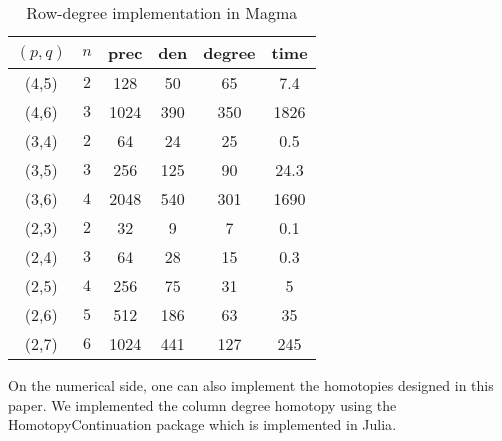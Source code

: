 \documentclass[amsthm]{elsart}
\begin{document}
\begin{center}
\begin{table}[h]
  \centering
  \begin{tabular}[]{cc|ccc|c}
    $(p,q)$ & $n$ & {\sf prec} & {\sf den} & {\sf degree} & {\sf time} \\
    \hline
    (4,5)   & $2$ &  128 &  50 &   65   &  7.4\\
    (4,6)   & $3$ & 1024 & 390 &  350   &1826 \\
    \hline
    (3,4)   & $2$ &   64 &  24 &   25   & 0.5 \\
    (3,5)   & $3$ &  256 & 125 &   90   & 24.3\\
    (3,6)   & $4$ & 2048 & 540 &  301   & 1690\\
    \hline
    (2,3)   & $2$ &  32  &   9 &    7   &  0.1\\
    (2,4)   & $3$ &  64  &  28 &   15   &  0.3\\
    (2,5)   & $4$ & 256  &  75 &   31   &    5\\
    (2,6)   & $5$ & 512  & 186 &   63   &   35\\
    (2,7)   & $6$ & 1024 & 441 &  127   &  245\\
    \hline
  \end{tabular}
  \smallskip
  \caption{Row-degree implementation in {\sf Magma}}    
  \label{tab:implem:rdeg}
\end{table}  
\end{center}





On the numerical side, one can also implement the homotopies designed in this
paper. We implemented the column degree homotopy using the {\sf
  HomotopyContinuation} package which is implemented in {\sf Julia}.
\end{document}
